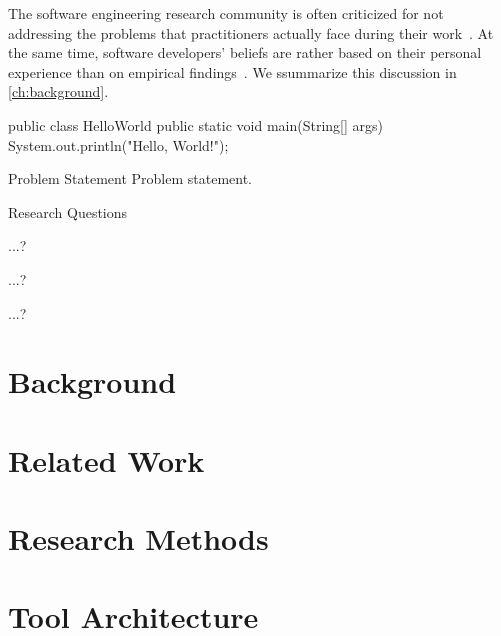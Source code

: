 The software engineering research community is often criticized for not addressing the problems that practitioners actually face during their work~\cite{Briand2012}.
At the same time, software developers' beliefs are rather based on their personal experience than on empirical findings~\cite{DevanbuZimmermannOthers2016}.
We s\textsf{s}ummarize this discussion in \autoref{ch:background}.

\begin{java}
public class HelloWorld {
  public static void main(String[] args) {
    System.out.println("Hello, World!");
  }
}
\end{java}


\begin{graybox}{Problem Statement}
Problem statement.
\end{graybox}


\begin{graybox}{Research Questions}
\begin{description}[style=multiline, labelindent=\parindent, leftmargin=\rqindent, itemsep=-1ex]
\item[RQ1] ...?
\item[RQ2] ...?
\item[RQ3] ...?
\end{description}
\end{graybox}

\chapter{Background}
\label{ch:background}

\lipsum[1-12]

\chapter{Related Work}
\label{ch:related-work}

\lipsum[1-4]

\chapter{Research Methods}
\label{ch:research-methods}

\lipsum[1-4]

\chapter{Tool Architecture}
\label{ch:tool-architecture}

